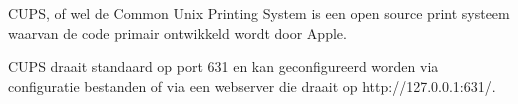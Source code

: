 CUPS, of wel de Common Unix Printing System is een open source print systeem waarvan de code primair ontwikkeld wordt door Apple.

CUPS draait standaard op port 631 en kan geconfigureerd worden via configuratie bestanden of via een webserver die draait op http://127.0.0.1:631/.

